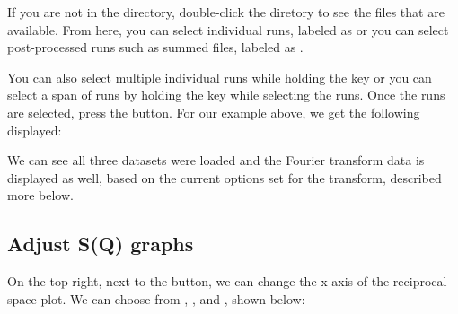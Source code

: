 If you are not in the  directory, double-click the  diretory to see the files that are available.  From here, you can select individual runs, labeled as  or you can select post-processed runs such as summed files, labeled as .

You can also select multiple individual runs while holding the  key or you can select a span of runs by holding the  key while selecting the runs. Once the runs are selected, press the  button. For our example above, we get the following displayed:

\noindent{}

We can see all three datasets were loaded and the Fourier transform data is displayed as well, based on the current options set for the transform, described more below. 

\subsection{Adjust S(Q) graphs}

On the top right, next to the  button, we can change the x-axis of the reciprocal-space plot. We can choose from , , and , shown below:

\noindent{}

